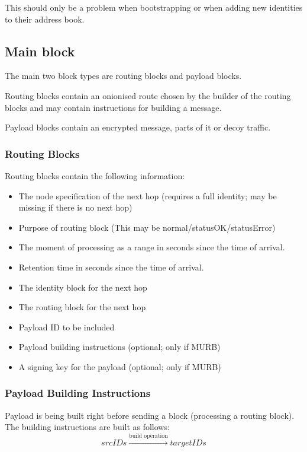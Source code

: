 This should only be a problem when bootstrapping or when adding new identities to their address book. 

\subsection{Main block}
The main two block types are routing blocks and payload blocks. 

Routing blocks contain an onionised route chosen by the builder of the routing blocks and may contain instructions for building a message.

Payload blocks contain an encrypted message, parts of it or decoy traffic.

\subsubsection{Routing Blocks}
Routing blocks contain the following information:
\begin{itemize}
	\item The node specification of the next hop (requires a full identity; may be missing  if there is no next hop)
	\item Purpose of routing block (This may be normal/statusOK/statusError)
	\item The moment of processing as a range in seconds since the time of arrival.
	\item Retention time in seconds since the time of arrival.
	\item The identity block for the next hop
	\item The routing block for the next hop
	\item Payload ID to be included
	\item Payload building instructions (optional; only if MURB)
	\item A signing key for the payload (optional; only if MURB)
\end{itemize}

\subsubsection{Payload Building Instructions\label{sec:buildInstr}}
Payload is being built right before sending a block (processing a routing block). The building instructions are built as follows:
\begin{equation*}
srcIDs \xrightarrow{\text{build operation}} targetIDs
\end{equation*}

